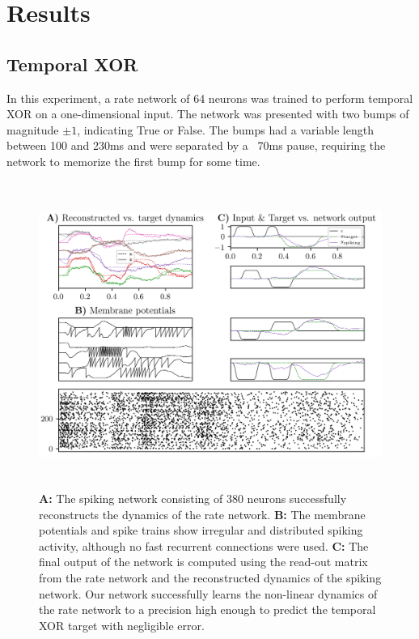 \documentclass[twoside,11pt,titlepage]{article}
\begin{document}
\section{Results}

\subsection{Temporal XOR}
In this experiment, a rate network of 64 neurons was trained to perform
temporal XOR on a one-dimensional input. The network was presented with two bumps
of magnitude $\pm 1$, indicating True or False. The bumps had a variable length
between 100 and 230ms and were separated by a ~70ms pause, requiring the network
to memorize the first bump for some time. 

\begin{figure}[!htb]
  \includegraphics[width = \columnwidth, height=10cm]{figures/figure2.png}
  \caption{\textbf{A:} The spiking network consisting
  of 380 neurons successfully reconstructs the dynamics of the rate network.
  \textbf{B:} The membrane potentials and spike trains show
  irregular and distributed spiking activity, although no fast recurrent connections were used.
  \textbf{C:} The final output of the network is computed using the read-out matrix from the
  rate network and the reconstructed dynamics of the spiking network. Our network successfully
  learns the non-linear dynamics of the rate network to a precision high enough to predict the
  temporal XOR target with negligible error.}
  \label{fig:figure2}
\end{figure}
\end{document}
